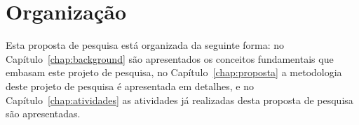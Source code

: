 







\section{Organização}

Esta proposta de pesquisa está organizada da seguinte forma:
no Capítulo~\ref{chap:background} são apresentados os conceitos fundamentais que embasam este projeto de pesquisa,
no Capítulo~\ref{chap:proposta} a metodologia deste projeto de pesquisa é apresentada em detalhes,
e no Capítulo~\ref{chap:atividades} as atividades já realizadas desta proposta de pesquisa são apresentadas.


